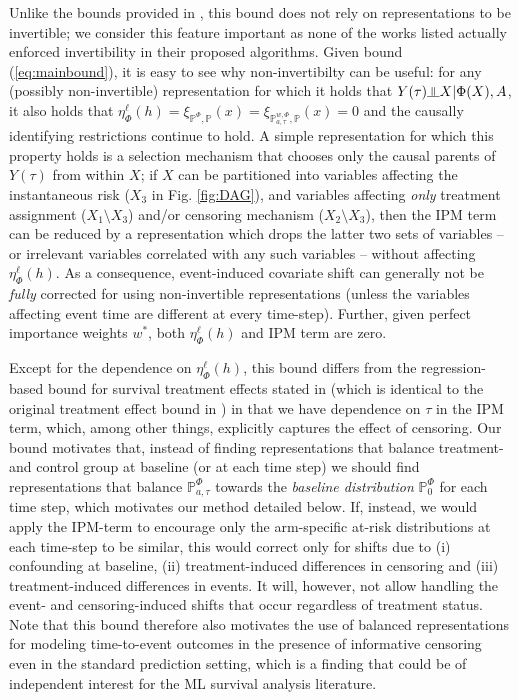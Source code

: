 \documentclass{article}
\newcommand{\indep}{\small {\raisebox{0.05em}{\rotatebox[origin=c]{90}{$\models$}}}}
\begin{document}
Unlike the bounds provided in \cite{Shalit:16, johansson2018learning, johansson2020generalization, assaad2021counterfactual, chapfuwa2021enabling}, this bound does not rely on representations to be invertible; we consider this feature important as none of the works listed actually enforced invertibility in their proposed algorithms. Given bound (\ref{eq:mainbound}), it is easy to see why non-invertibilty can be useful: for any (possibly non-invertible) representation for which it holds that $Y(\tau) \indep X | \Phi(X), A$, it also holds that $\eta^\ell_\Phi(h)=\xi_{\mathbb{P}^\Phi, \mathbb{P}}(x)=\xi_{\mathbb{P}^{w,\Phi}_{a, \tau}, \mathbb{P}}(x)=0$ and the causally identifying restrictions continue to hold. A simple representation for which this property holds is a selection mechanism that chooses only the causal parents of $Y(\tau)$ from within $X$; if $X$ can be partitioned into variables affecting the instantaneous risk ($X_3$ in Fig. \ref{fig:DAG}), and variables affecting \textit{only} treatment assignment ($X_1 \setminus X_3$) and/or censoring mechanism  ($X_2 \setminus X_3$), then the IPM term can be reduced by a representation which drops the latter two sets of variables --  or irrelevant variables correlated with any such variables -- without affecting $\eta^\ell_\Phi(h)$. As a consequence, event-induced covariate shift can generally not be \textit{fully} corrected for using non-invertible representations (unless the variables affecting event time are different at every time-step). Further, given perfect importance weights $w^*$, both $\eta^{\ell}_\Phi(h)$ and IPM term are zero.

Except for the dependence on $\eta^\ell_\Phi(h)$, this bound differs from the regression-based bound for survival treatment effects stated in \cite{chapfuwa2021enabling} (which is identical to the original treatment effect bound in \cite{Shalit:16}) in that we have dependence on $\tau$ in the IPM term, which, among other things, explicitly captures the effect of censoring. Our bound motivates that, instead of finding representations that balance treatment- and control group at baseline (or at each time step) we should find representations that balance $\mathbb{P}^\Phi_{a, \tau}$ towards the \textit{baseline distribution} $\mathbb{P}_0^\Phi$ for each time step, which motivates our method detailed below. If, instead, we would apply the IPM-term to encourage only the arm-specific at-risk distributions at each time-step  to be similar, this would correct only for shifts due to (i) confounding at baseline, (ii) treatment-induced differences in censoring and (iii) treatment-induced differences in events. It will, however, not allow handling the event- and censoring-induced shifts that occur regardless of treatment status.  Note that this bound therefore also motivates the use of balanced representations for modeling time-to-event outcomes in the presence of informative censoring even in the standard prediction setting, which is a finding that could be of independent interest for the ML survival analysis literature.
\end{document}
